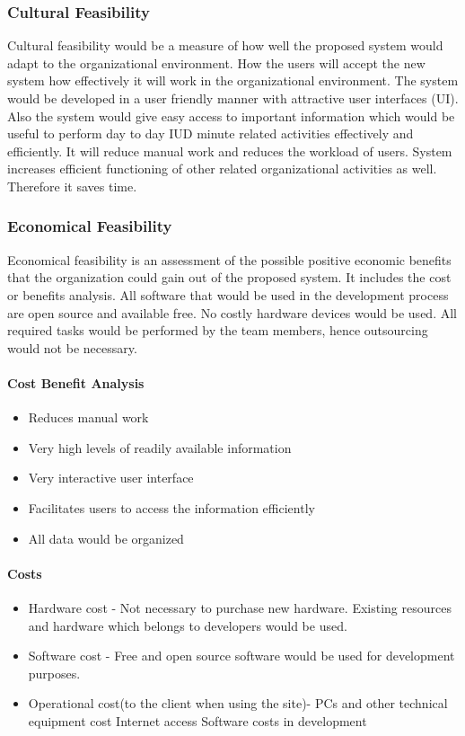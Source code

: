 \documentclass[a4paper,beamer]{article}
\begin{document}
	\subsubsection{Cultural Feasibility}
	Cultural feasibility would be a measure of how well the proposed system would adapt to the organizational environment. How the users will accept the new system how effectively it will work in the organizational environment.
	The system would be developed in a user friendly manner with attractive user interfaces (UI). Also the system would give easy access to important information which would be useful to perform day to day IUD minute related activities effectively and efficiently.
	It will reduce manual work and reduces the workload of users.
	System increases efficient functioning of other related organizational activities as well. Therefore it saves time.
	
	\subsubsection{Economical Feasibility}
	Economical feasibility is an assessment of the possible positive economic benefits that the organization could gain out of the proposed system. It includes the cost or benefits analysis. All software that would be used in the development process are open source and available free. No costly hardware devices would be used. All required tasks would be performed by the team members, hence outsourcing would not be necessary.
	
	\paragraph{\textbf{Cost Benefit Analysis}}
	\begin{itemize}
		\item Reduces manual work
		\item Very high levels of readily available information
		\item Very interactive user interface
		\item Facilitates users to access the information efficiently
		\item All data would be organized
	\end{itemize}
	
	\paragraph{\textbf{Costs}}
	\begin{itemize}
		\item Hardware cost -
		Not necessary to purchase new hardware. Existing resources and hardware which belongs to developers would be used.
		\item Software cost - 
		Free and open source software would be used for development purposes.
		\item Operational cost(to the client when using the site)-
		PCs and other technical equipment cost
		Internet access
		Software costs in development
	\end{itemize}
	
\end{document}
